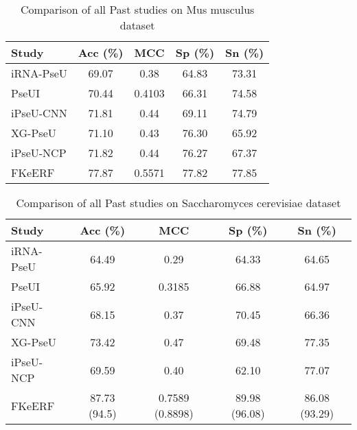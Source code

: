     \begin{table}[h!]
      \centering
      \begin{tabular}{lcccc}
        \toprule
        \textbf{Study}                           & \textbf{Acc} (\%) & \textbf{MCC} & \textbf{Sp} (\%) & \textbf{Sn} (\%) \\
        \midrule
        iRNA-PseU\cite{chen_irna-pseu_nodate}    & 69.07             & 0.38         & 64.83            & 73.31            \\
        PseUI\cite{he_pseui_2018}                & 70.44             & 0.4103       & 66.31            & 74.58            \\
        iPseU-CNN\cite{tahir_ipseu-cnn_nodate}   & 71.81             & 0.44         & 69.11            & 74.79            \\
        XG-PseU\cite{liu_xg-pseu_2020}           & 71.10             & 0.43         & 76.30            & 65.92            \\
        iPseU-NCP\cite{nguyen-vo_ipseu-ncp_2019} & 71.82             & 0.44         & 76.27            & 67.37            \\
        FKeERF\cite{chen_fuzzy_2024}             & 77.87             & 0.5571       & 77.82            & 77.85            \\
        \bottomrule
      \end{tabular}
      \caption{Comparison of all Past studies on Mus musculus dataset}
      \label{tab:mouse_comp_table}
    \end{table}

    \begin{table}[h!]
      \centering
      \begin{tabular}{lcccc}
        \toprule
        \textbf{Study}                           & \textbf{Acc} (\%) & \textbf{MCC}    & \textbf{Sp} (\%) & \textbf{Sn} (\%) \\
        \midrule
        iRNA-PseU\cite{chen_irna-pseu_nodate}    & 64.49             & 0.29            & 64.33            & 64.65            \\
        PseUI\cite{he_pseui_2018}                & 65.92             & 0.3185          & 66.88            & 64.97            \\
        iPseU-CNN\cite{tahir_ipseu-cnn_nodate}   & 68.15             & 0.37            & 70.45            & 66.36            \\
        XG-PseU\cite{liu_xg-pseu_2020}           & 73.42             & 0.47            & 69.48            & 77.35            \\
        iPseU-NCP\cite{nguyen-vo_ipseu-ncp_2019} & 69.59             & 0.40            & 62.10            & 77.07            \\
        FKeERF\cite{chen_fuzzy_2024}             & 87.73 (94.5)      & 0.7589 (0.8898) & 89.98 (96.08)    & 86.08 (93.29)    \\
        \bottomrule
      \end{tabular}
      \caption{Comparison of all Past studies on Saccharomyces cerevisiae dataset}
      \label{tab:yeast_comp_table}
    \end{table}
